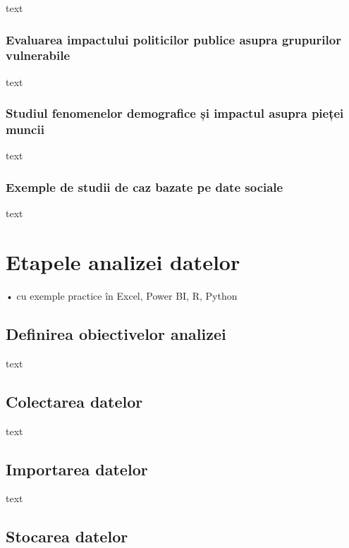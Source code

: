 \documentclass[
  11pt,
  b5paper,
  nottoc]{book}
\begin{document}
text

\subsection{Evaluarea impactului politicilor publice asupra grupurilor
vulnerabile}\label{evaluarea-impactului-politicilor-publice-asupra-grupurilor-vulnerabile}

text

\subsection{Studiul fenomenelor demografice și impactul asupra pieței
muncii}\label{studiul-fenomenelor-demografice-ux219i-impactul-asupra-pieux21bei-muncii}

text

\subsection{Exemple de studii de caz bazate pe date
sociale}\label{exemple-de-studii-de-caz-bazate-pe-date-sociale}

text


\chapter{Etapele analizei datelor}\label{cap7}

• cu exemple practice în Excel, Power BI, R, Python

\section{Definirea obiectivelor
analizei}\label{definirea-obiectivelor-analizei}

text

\section{Colectarea datelor}\label{colectarea-datelor}

text

\section{Importarea datelor}\label{importarea-datelor}

text

\section{Stocarea datelor}\label{stocarea-datelor}
\end{document}
